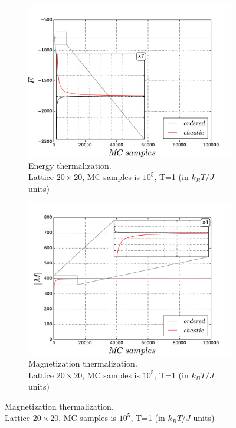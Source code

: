\documentclass[a4paper]{article}
\begin{document}
\begin{figure}[h!] 
  \begin{subfigure}[b]{0.5\linewidth}
    \centering
    \includegraphics[width=1.0\linewidth]{20x20_10_5_1_energy} 
    \caption{Energy thermalization. \\ Lattice $20 \times 20$, MC samples is $10^5$, T=1 (in $k_BT/J$ units)} 
    \label{fig1:a} 
    \vspace{1ex}
  \end{subfigure}
  \begin{subfigure}[b]{0.5\linewidth}
    \centering
    \includegraphics[width=1.0\linewidth]{20x20_10_5_1_magnet} 
    \caption{Magnetization thermalization. \\ Lattice $20 \times 20$, MC samples is $10^5$, T=1 (in $k_BT/J$ units)} 

\end{subfigure}
\end{figure}
\end{document}
